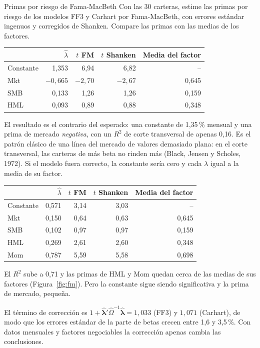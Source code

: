 \begin{ejresuelto}{Primas por riesgo de Fama-MacBeth}\label{ej:fm}
\enunciado Con las 30 carteras, estime las primas por riesgo de los modelos FF3 y Carhart por Fama-MacBeth, con errores
estándar ingenuos y corregidos de Shanken. Compare las primas con las medias de los factores.

\solucion
{}
\begin{center}\small
\begin{tabular}{@{}lrrrr@{}}
\toprule
 & $\hat\lambda$ & $t$ FM & $t$ Shanken & Media del factor \\
\midrule
Constante & 1,353 & 6,94 & 6,82 & -- \\
Mkt & $-0{,}665$ & $-2{,}70$ & $-2{,}67$ & 0,645 \\
SMB & 0,133 & 1,26 & 1,26 & 0,159 \\
HML & 0,093 & 0,89 & 0,88 & 0,348 \\
\bottomrule
\end{tabular}
\end{center}
El resultado es el contrario del esperado: una constante de 1,35\,\% mensual y una prima de mercado \emph{negativa}, con un
$R^2$ de corte transversal de apenas 0,16. Es el patrón clásico de una línea del mercado de valores demasiado plana:
en el corte transversal, las carteras de más beta no rinden más (Black, Jensen y Scholes, 1972). Si el modelo fuera
correcto, la constante sería cero y cada $\lambda$ igual a la media de su factor.

\begin{center}\small
\begin{tabular}{@{}lrrrr@{}}
\toprule
 & $\hat\lambda$ & $t$ FM & $t$ Shanken & Media del factor \\
\midrule
Constante & 0,571 & 3,14 & 3,03 & -- \\
Mkt & 0,150 & 0,64 & 0,63 & 0,645 \\
SMB & 0,102 & 0,97 & 0,97 & 0,159 \\
HML & 0,269 & 2,61 & 2,60 & 0,348 \\
Mom & 0,787 & 5,59 & 5,58 & 0,698 \\
\bottomrule
\end{tabular}
\end{center}
El $R^2$ sube a 0,71 y las primas de HML y Mom quedan cerca de las medias de sus factores (Figura~\ref{fig:fm}). Pero la
constante sigue siendo significativa y la prima de mercado, pequeña.

 El término de corrección es $1+\hat{\boldsymbol\lambda}'\hat\Omega^{-1}\hat{\boldsymbol\lambda}=1{,}033$ (FF3) y
$1{,}071$ (Carhart), de modo que los errores estándar de la parte de betas crecen entre 1,6 y 3,5\,\%. Con datos mensuales y
factores negociables la corrección apenas cambia las conclusiones.


\end{ejresuelto}

